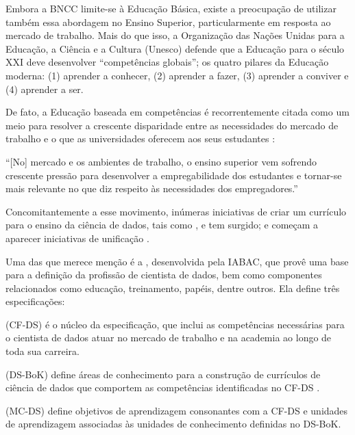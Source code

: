Embora a BNCC limite-se à Educação Básica, existe a preocupação de utilizar também essa abordagem no Ensino Superior, particularmente em resposta ao mercado de trabalho.
Mais do que isso, a Organização das Nações Unidas para a Educação, a Ciência e a Cultura (Unesco) defende que a Educação para o século XXI deve desenvolver ``competências globais''; os quatro pilares da Educação moderna: (1) aprender a conhecer, (2) aprender a fazer, (3) aprender a conviver e (4) aprender a ser.

De fato, a Educação baseada em competências é recorrentemente citada como um meio para resolver a crescente disparidade entre as necessidades do mercado de trabalho e o que as universidades oferecem aos seus estudantes \cite{Zulauf2006}: 

\begin{mycitation}
	``[No] mercado e os ambientes de trabalho, o ensino superior vem sofrendo crescente pressão para desenvolver a empregabilidade dos estudantes e tornar-se mais relevante no que diz respeito às necessidades dos empregadores.''
\end{mycitation}

Concomitantemente a esse movimento, inúmeras iniciativas  de criar um currículo para o ensino da ciência de dados, tais como \cite{Hassan2019}, \cite{Anderson2014} e \cite{Cheng2019} tem surgido; e começam a aparecer iniciativas de unificação \cite{Raj2019}.

Uma das que merece menção é a , desenvolvida pela IABAC, que provê uma base para a definição da profissão de cientista de dados, bem como componentes relacionados como educação, treinamento, papéis, dentre outros.
Ela define três especificações:
\begin{compactitem}
	\item {} (CF-DS) é o núcleo da especificação, que inclui as competências necessárias para o cientista de dados atuar no mercado de trabalho e na academia ao longo de toda sua carreira.
	\item {} (DS-BoK) define áreas de conhecimento para a construção de currículos de ciência de dados que comportem as competências identificadas no CF-DS \cite{Demchenko2017}.
	\item {} (MC-DS) define objetivos de aprendizagem consonantes com a CF-DS e unidades de aprendizagem associadas às unidades de conhecimento definidas no DS-BoK.
\end{compactitem}

